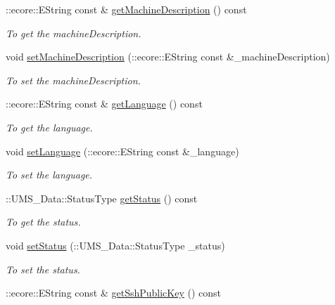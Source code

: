 \begin{DoxyCompactItemize}
::ecore::EString const \& \hyperlink{classUMS__Data_1_1Machine_a4833997e4cd3519b22d8897c343da8c3}{getMachineDescription} () const 
\begin{DoxyCompactList}\small\item\em To get the machineDescription. \item\end{DoxyCompactList}\item 
void \hyperlink{classUMS__Data_1_1Machine_ac9b59059e06ebc1d14cf2b152353e73f}{setMachineDescription} (::ecore::EString const \&\_\-machineDescription)
\begin{DoxyCompactList}\small\item\em To set the machineDescription. \item\end{DoxyCompactList}\item 
::ecore::EString const \& \hyperlink{classUMS__Data_1_1Machine_aebee47020c9bc7dccdf9d8c14a2e6a6d}{getLanguage} () const 
\begin{DoxyCompactList}\small\item\em To get the language. \item\end{DoxyCompactList}\item 
void \hyperlink{classUMS__Data_1_1Machine_a6e8acd0e714d9786ab64598aa2940647}{setLanguage} (::ecore::EString const \&\_\-language)
\begin{DoxyCompactList}\small\item\em To set the language. \item\end{DoxyCompactList}\item 
::UMS\_\-Data::StatusType \hyperlink{classUMS__Data_1_1Machine_ac23d561c975142fa75e0d975bc02d0f6}{getStatus} () const 
\begin{DoxyCompactList}\small\item\em To get the status. \item\end{DoxyCompactList}\item 
void \hyperlink{classUMS__Data_1_1Machine_a0d1866d332f1214048598e33fcce31c8}{setStatus} (::UMS\_\-Data::StatusType \_\-status)
\begin{DoxyCompactList}\small\item\em To set the status. \item\end{DoxyCompactList}\item 
::ecore::EString const \& \hyperlink{classUMS__Data_1_1Machine_af6a8a3688249c026832aa1ff3c02c239}{getSshPublicKey} () const 

\end{DoxyCompactItemize}
